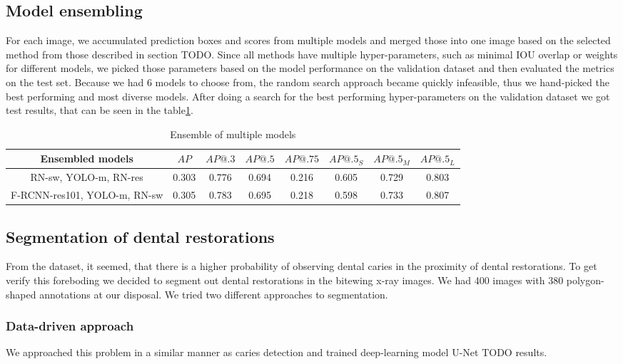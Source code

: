 \subsection{Model ensembling}
For each image, we accumulated prediction boxes and scores from multiple models and merged those into one image based on the selected method from those described in section TODO. Since all methods have multiple hyper-parameters, such as minimal IOU overlap or weights for different models, we picked those parameters based on the model performance on the validation dataset and then evaluated the metrics on the test set. Because we had 6 models to choose from, the random search approach became quickly infeasible, thus we hand-picked the best performing and most diverse models. After doing a search for the best performing hyper-parameters on the validation dataset we got test results, that can be seen in the table\ref{tab:model_ensembling}.
\begin{table}
    \begin{tabular}{c||c|c|c|c|c|c|c}
        Ensembled models             & $AP$  & $AP@.3$ & $AP@.5$ & $AP@.75$ & $AP@.5_S$ & $AP@.5_M$ & $AP@.5_L$ \\ \hline \hline
        RN-sw, YOLO-m, RN-res        & 0.303 & 0.776   & 0.694   & 0.216    & 0.605     & 0.729     & 0.803     \\ \hline
        F-RCNN-res101, YOLO-m, RN-sw & 0.305 & 0.783   & 0.695   & 0.218    & 0.598     & 0.733     & 0.807     \\
    \end{tabular}
    \caption{Ensemble of multiple models}
    \label{tab:model_ensembling}
\end{table}

\subsection{Segmentation of dental restorations}
From the dataset, it seemed, that there is a higher probability of observing dental caries in the proximity of dental restorations. To get verify this foreboding we decided to segment out dental restorations in the bitewing x-ray images. We had 400 images with 380 polygon-shaped annotations at our disposal. We tried two different approaches to segmentation.

\subsubsection{Data-driven approach}
We approached this problem in a similar manner as caries detection and trained deep-learning model U-Net TODO results.

